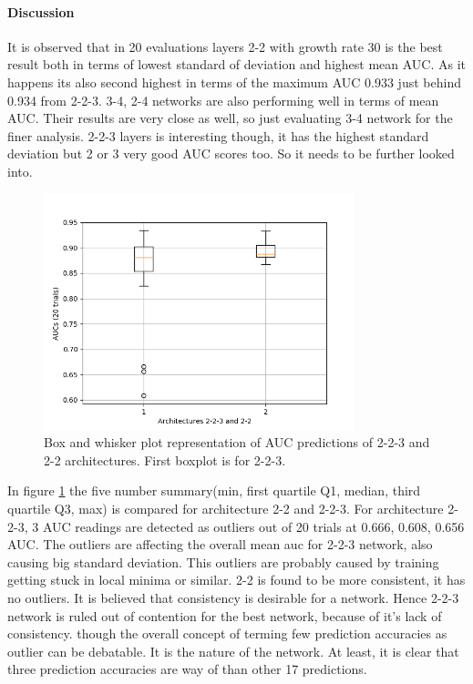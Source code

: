 \newpage
\paragraph{Discussion\\}
It is observed that in 20 evaluations layers 2-2 with growth rate 30 is the best result both in terms of lowest standard of deviation and highest mean AUC. As it happens its also second highest in terms of the 
 maximum AUC 0.933 just behind 0.934 from 2-2-3.
3-4, 2-4 networks are also performing well in terms of mean AUC. Their results are very close as well, so just evaluating 3-4 network for the finer analysis.
2-2-3 layers is interesting though, it has the highest standard deviation but 2 or 3 very good AUC scores too. So it needs to be further looked into.

\begin{figure}[htp]
\centering
\includegraphics[width=9cm]{images/densenet/arch_compare_boxplot.png}
\caption{Box and whisker plot representation of AUC predictions of 2-2-3 and 2-2 architectures. First boxplot is for 2-2-3.}
\label{fig:arch_compare_boxplot}
\end{figure}

In figure \ref{fig:arch_compare_boxplot} the five number summary(min, first quartile Q1, median, third quartile Q3, max) is compared for architecture 2-2 and 2-2-3. For architecture 2-2-3, 3 AUC readings are detected as outliers 
out of 20 trials at 0.666, 0.608, 0.656 AUC. The outliers are affecting the overall mean auc for 2-2-3 network, also causing big standard deviation. This outliers are probably caused by training getting stuck in local minima or similar. 
2-2 is found to be more consistent, it has no outliers. It is believed that consistency is desirable for a network. Hence 2-2-3 network is ruled out of contention for the best network, because of it's lack of consistency.
though the overall concept of terming few prediction accuracies as outlier can be debatable. It is the nature of the network. At least, it is clear that three prediction accuracies are way of than other 17 predictions.


